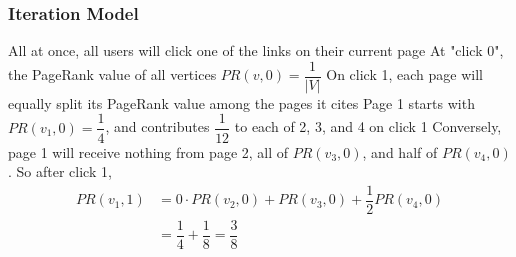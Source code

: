 \documentclass{beamer}
\begin{document}
\begin{frame}[t]
\frametitle{Iteration Model}
\begin{outline}
    \1 All at once, all users will click one of the links on their current page
    \1 At "click 0", the PageRank value of all vertices $PR(v, 0) = \dfrac{1}{|V|}$
    \1 On click 1, each page will equally split its PageRank value among the pages it cites
    \1 Page 1 starts with $PR(v_1, 0) = \dfrac{1}{4}$, and contributes $\dfrac{1}{12}$ to each of 2, 3, and 4 on click 1
    \1 Conversely, page 1 will receive nothing from page 2, all of $PR(v_3, 0)$, and half of $PR(v_4, 0)$. So after click 1, 
    \begin{align*}
        PR(v_1, 1) &= 0\cdot PR(v_2, 0) + PR(v_3, 0) + \dfrac{1}{2}PR(v_4, 0) \\
        &= \dfrac{1}{4} + \dfrac{1}{8} = \dfrac{3}{8}\\
    \end{align*}
\end{outline}
\end{frame}

\end{document}
